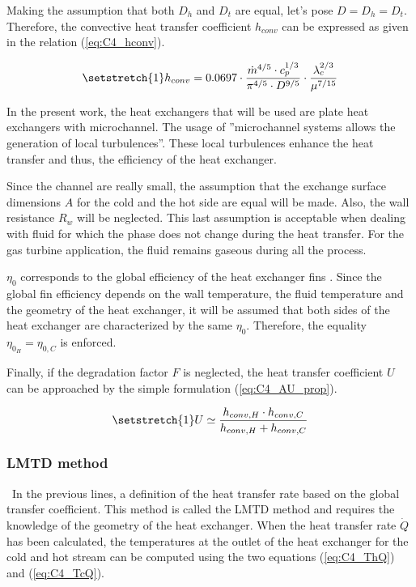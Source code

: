 Making the assumption that both \(D_h\) and \(D_t\) are equal, let's pose \(D=D_h=D_t\). Therefore, the convective heat transfer coefficient \(h_{conv}\) can be expressed as given in the relation (\ref{eq:C4_hconv}).


\begin{equation}
    \setstretch{1}
    h_{conv} = 0.0697\cdot \frac{\dot{m}^{4/5}\cdot c_p^{1/3}}{\pi^{4/5}\cdot D^{9/5}}\cdot \frac{\lambda_c^{2/3}}{\mu^{7/15}} \label{eq:C4_hconv}
\end{equation}

In the present work, the heat exchangers that will be used are plate heat exchangers with microchannel. The usage of ''microchannel systems allows the generation of local turbulences''\cite{Joseph2020}. These local turbulences enhance the heat transfer and thus, the efficiency of the heat exchanger.

Since the channel are really small, the assumption that the exchange surface dimensions \(A\) for the cold and the hot side are equal will be made. Also, the wall resistance \(R_w\) will be neglected. This last assumption is acceptable when dealing with fluid for which the phase does not change during the heat transfer. For the gas turbine application, the fluid remains gaseous during all the process. 

\(\eta_0\) corresponds to the global efficiency of the heat exchanger fins \cite{GregoryNellis2015}. Since the global fin efficiency depends on the wall temperature, the fluid temperature and the geometry of the heat exchanger, it will be assumed that both sides of the heat exchanger are characterized by the same $\eta_0$. Therefore, the equality $\eta_{0_H}=\eta_{0,C}$ is enforced.

Finally, if the degradation factor $F$ is neglected, the heat transfer coefficient \(U\) can be approached by the simple formulation (\ref{eq:C4_AU_prop}).


 \begin{equation}
    \setstretch{1}
    U \simeq \frac{h_{conv,H}\cdot h_{conv,C}}{h_{conv,H} + h_{conv,C}}\label{eq:C4_AU_prop}
\end{equation}
\subsubsection{LMTD method}
\quad\ In the previous lines, a definition of the heat transfer rate based on the global transfer coefficient. This method is called the LMTD method and requires the knowledge of the geometry of the heat exchanger.
When the heat transfer rate \(\dot{Q}\) has been calculated, the temperatures at the outlet of the heat exchanger for the cold and hot stream can be computed using the two equations (\ref{eq:C4_ThQ}) and (\ref{eq:C4_TcQ}).

